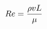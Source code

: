 \documentclass[preview]{standalone}
\begin{document}
\begin{align*}
Re = { \rho v L \over \mu }
\end{align*}
\end{document}
